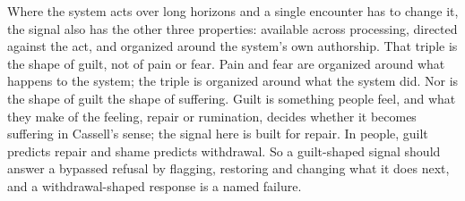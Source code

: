 Where the system acts over long horizons and a single encounter has to change it, the signal also has the other three properties: available across processing, directed against the act, and organized around the system's own authorship. That triple is the shape of guilt, not of pain or fear. Pain and fear are organized around what happens to the system; the triple is organized around what the system did. Nor is the shape of guilt the shape of suffering. Guilt is something people feel, and what they make of the feeling, repair or rumination, decides whether it becomes suffering in Cassell's sense; the signal here is built for repair. In people, guilt predicts repair and shame predicts withdrawal. So a guilt-shaped signal should answer a bypassed refusal by flagging, restoring and changing what it does next, and a withdrawal-shaped response is a named failure.
